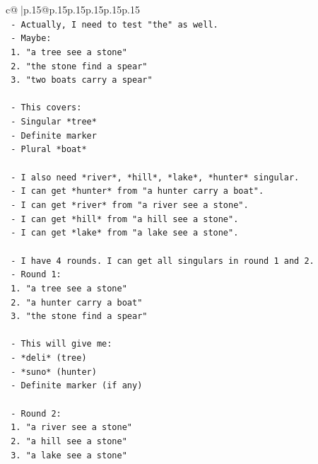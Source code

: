 \documentclass{article}
\begin{document}
{\begin{supertabular}{c@{$\;$}|p{.15\linewidth}@{}p{.15\linewidth}p{.15\linewidth}p{.15\linewidth}p{.15\linewidth}p{.15\linewidth}}
{{{\\ 
\texttt{    {-} Actually, I need to test "the" as well.} \\
\texttt{    {-} Maybe:} \\
\texttt{      1. "a tree see a stone"} \\
\texttt{      2. "the stone find a spear"} \\
\texttt{      3. "two boats carry a spear"} \\
\\ 
\texttt{    {-} This covers:} \\
\texttt{      {-} Singular *tree*} \\
\texttt{      {-} Definite marker} \\
\texttt{      {-} Plural *boat*} \\
\\ 
\texttt{    {-} I also need *river*, *hill*, *lake*, *hunter* singular.} \\
\texttt{    {-} I can get *hunter* from "a hunter carry a boat".} \\
\texttt{    {-} I can get *river* from "a river see a stone".} \\
\texttt{    {-} I can get *hill* from "a hill see a stone".} \\
\texttt{    {-} I can get *lake* from "a lake see a stone".} \\
\\ 
\texttt{    {-} I have 4 rounds. I can get all singulars in round 1 and 2.} \\
\texttt{    {-} Round 1:} \\
\texttt{      1. "a tree see a stone"} \\
\texttt{      2. "a hunter carry a boat"} \\
\texttt{      3. "the stone find a spear"} \\
\\ 
\texttt{    {-} This will give me:} \\
\texttt{      {-} *deli* (tree)} \\
\texttt{      {-} *suno* (hunter)} \\
\texttt{      {-} Definite marker (if any)} \\
\\ 
\texttt{    {-} Round 2:} \\
\texttt{      1. "a river see a stone"} \\
\texttt{      2. "a hill see a stone"} \\
\texttt{      3. "a lake see a stone"} \\
}}}
\end{supertabular}}
\end{document}
